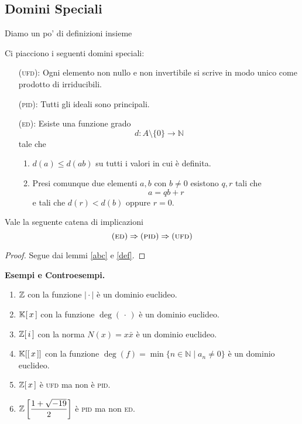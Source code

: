 \subsection{Domini Speciali}
\begin{multicols}{2}
	Diamo un po' di definizioni insieme
	\begin{definition}
		Ci piacciono i seguenti domini speciali:
		\begin{itemize}
			\item [(\textsc{ufd}):] Ogni elemento non nullo e non invertibile si scrive in modo unico come prodotto di irriducibili.
			
			\item [(\textsc{pid}):] Tutti gli ideali sono principali.
			
			\item [(\textsc{ed}):] Esiste una funzione grado \[{d}:{A\setminus\{0\}}\to{\mathbb{N}}\]
			tale che 
			\begin{enumerate}
				\item $ d(a) \leq d(ab) $ su tutti i valori in cui è definita.
				\item Presi comunque due elementi $ a, b $ con $ b \neq 0 $ esistono $ q, r $ tali che
				\[ a = qb + r \]
				e tali che $ d(r) < d(b) $ oppure $ r = 0 $.
			\end{enumerate}
			
		\end{itemize}
	\end{definition}

\begin{theorem}
	Vale la seguente catena di implicazioni
	\[ (\textsc{ed})\Rightarrow(\textsc{pid})\Rightarrow(\textsc{ufd}) \]
\end{theorem}
\begin{proof}
	Segue dai lemmi \ref{abc} e \ref{def}. 
\end{proof}

\textbf{Esempi e Controesempi.}
\begin{enumerate}
	\item $ \mathbb{Z} $ con la funzione $ \mid \cdot\mid $ è un dominio euclideo.
	\item $ \mathbb{K}[\,x\,] $ con la funzione $ \deg(\,\cdot\,) $ è un dominio euclideo.
	\item $ \mathbb{Z}[\,i\,] $ con la norma $ N(x) = x\bar{x} $ è un dominio euclideo.
	\item $ \mathbb{K}[[\,x\,]] $ con la funzione $ \deg(f) = \min \{n \in \mathbb{N} \mid a_n \neq 0 \} $ è un dominio euclideo.
	\item $ \mathbb{Z}[\,x\,] $ è \textsc{ufd} ma non è \textsc{pid}.
	\item $ \mathbb{Z}\left[ \dfrac{1 + \sqrt{-19}}{2} \right] $ è \textsc{pid} ma non \textsc{ed}.
\end{enumerate}
	

\end{multicols}
